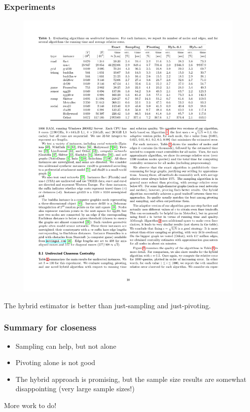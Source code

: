 \begin{frame}
  \frametitle{Experiments}
  \begin{figure}
    \includegraphics[width=\textwidth]{imgs/cohenhybrid.pdf}
  \end{figure}
  The hybrid estimator is better than just-sampling and just-pivoting.
\end{frame}

\begin{frame}
  \frametitle{Summary for closeness}
  \begin{itemize}
    \item Sampling can help, but not alone
    \item Pivoting alone is not good
    \item The hybrid approach is promising, but the sample size results are
      somewhat disappointing (very large sample sizes!)
  \end{itemize}
  More work to do!
\end{frame}


